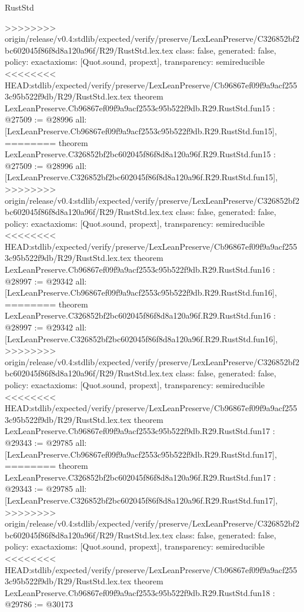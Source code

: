 \begin{lexlean}{RustStd}
\begin{coremodule}
{\begin{coremodule}
{{{{{{{{{{{{{{{{{{>>>>>>>> origin/release/v0.4:stdlib/expected/verify/preserve/LexLeanPreserve/C326852bf2bc602045f86f8d8a120a96f/R29/RustStd.lex.tex
  class: false,
  generated: false,
  policy: exact{axioms: [Quot.sound, propext]},
  transparency: semireducible
}
<<<<<<<< HEAD:stdlib/expected/verify/preserve/LexLeanPreserve/Cb96867ef09f9a9acf2553c95b522f9db/R29/RustStd.lex.tex
theorem LexLeanPreserve.Cb96867ef09f9a9acf2553c95b522f9db.R29.RustStd.fun15 : @27509 := @28996 {
  all: [LexLeanPreserve.Cb96867ef09f9a9acf2553c95b522f9db.R29.RustStd.fun15],
========
theorem LexLeanPreserve.C326852bf2bc602045f86f8d8a120a96f.R29.RustStd.fun15 : @27509 := @28996 {
  all: [LexLeanPreserve.C326852bf2bc602045f86f8d8a120a96f.R29.RustStd.fun15],
>>>>>>>> origin/release/v0.4:stdlib/expected/verify/preserve/LexLeanPreserve/C326852bf2bc602045f86f8d8a120a96f/R29/RustStd.lex.tex
  class: false,
  generated: false,
  policy: exact{axioms: [Quot.sound, propext]},
  transparency: semireducible
}
<<<<<<<< HEAD:stdlib/expected/verify/preserve/LexLeanPreserve/Cb96867ef09f9a9acf2553c95b522f9db/R29/RustStd.lex.tex
theorem LexLeanPreserve.Cb96867ef09f9a9acf2553c95b522f9db.R29.RustStd.fun16 : @28997 := @29342 {
  all: [LexLeanPreserve.Cb96867ef09f9a9acf2553c95b522f9db.R29.RustStd.fun16],
========
theorem LexLeanPreserve.C326852bf2bc602045f86f8d8a120a96f.R29.RustStd.fun16 : @28997 := @29342 {
  all: [LexLeanPreserve.C326852bf2bc602045f86f8d8a120a96f.R29.RustStd.fun16],
>>>>>>>> origin/release/v0.4:stdlib/expected/verify/preserve/LexLeanPreserve/C326852bf2bc602045f86f8d8a120a96f/R29/RustStd.lex.tex
  class: false,
  generated: false,
  policy: exact{axioms: [Quot.sound, propext]},
  transparency: semireducible
}
<<<<<<<< HEAD:stdlib/expected/verify/preserve/LexLeanPreserve/Cb96867ef09f9a9acf2553c95b522f9db/R29/RustStd.lex.tex
theorem LexLeanPreserve.Cb96867ef09f9a9acf2553c95b522f9db.R29.RustStd.fun17 : @29343 := @29785 {
  all: [LexLeanPreserve.Cb96867ef09f9a9acf2553c95b522f9db.R29.RustStd.fun17],
========
theorem LexLeanPreserve.C326852bf2bc602045f86f8d8a120a96f.R29.RustStd.fun17 : @29343 := @29785 {
  all: [LexLeanPreserve.C326852bf2bc602045f86f8d8a120a96f.R29.RustStd.fun17],
>>>>>>>> origin/release/v0.4:stdlib/expected/verify/preserve/LexLeanPreserve/C326852bf2bc602045f86f8d8a120a96f/R29/RustStd.lex.tex
  class: false,
  generated: false,
  policy: exact{axioms: [Quot.sound, propext]},
  transparency: semireducible
}
<<<<<<<< HEAD:stdlib/expected/verify/preserve/LexLeanPreserve/Cb96867ef09f9a9acf2553c95b522f9db/R29/RustStd.lex.tex
theorem LexLeanPreserve.Cb96867ef09f9a9acf2553c95b522f9db.R29.RustStd.fun18 : @29786 := @30173 {
}}}}}}}}}}}}}}}}}}}}}
\end{coremodule}}
\end{coremodule}
\end{lexlean}
